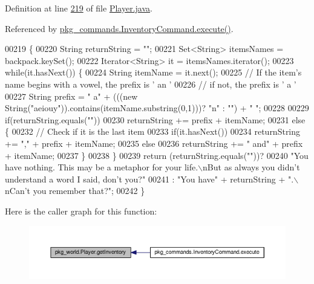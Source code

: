 Definition at line \hyperlink{Player_8java_source_l00219}{219} of file \hyperlink{Player_8java_source}{Player.\-java}.



Referenced by \hyperlink{InventoryCommand_8java_source_l00023}{pkg\-\_\-commands.\-Inventory\-Command.\-execute()}.


\begin{DoxyCode}
00219                                  \{
00220         String returnString = \textcolor{stringliteral}{""};
00221         Set<String> itemsNames = backpack.keySet();
00222         Iterator<String> it = itemsNames.iterator();
00223         \textcolor{keywordflow}{while}(it.hasNext()) \{
00224             String itemName = it.next();
00225             \textcolor{comment}{// If the item's name begins with a vowel, the prefix is ' an '}
00226             \textcolor{comment}{// if not, the prefix is ' a '}
00227             String prefix = \textcolor{stringliteral}{" a"} + (((\textcolor{keyword}{new} String(\textcolor{stringliteral}{"aeiouy"})).contains(itemName.substring(0,1)))? \textcolor{stringliteral}{"n"} : \textcolor{stringliteral}{""}) +
       \textcolor{stringliteral}{" "};
00228 
00229             \textcolor{keywordflow}{if}(returnString.equals(\textcolor{stringliteral}{""}))
00230                 returnString += prefix + itemName;
00231             \textcolor{keywordflow}{else} \{
00232                 \textcolor{comment}{// Check if it is the last item}
00233                 \textcolor{keywordflow}{if}(it.hasNext())
00234                     returnString += \textcolor{stringliteral}{","} + prefix + itemName;
00235                 \textcolor{keywordflow}{else}
00236                     returnString += \textcolor{stringliteral}{" and"} + prefix + itemName;
00237             \}
00238         \}
00239         \textcolor{keywordflow}{return} (returnString.equals(\textcolor{stringliteral}{""}))?
00240             \textcolor{stringliteral}{"You have nothing. This may be a metaphor for your life.\(\backslash\)nBut as always you didn't understand a
       word I said, don't you?"}
00241             : \textcolor{stringliteral}{"You have"} + returnString + \textcolor{stringliteral}{".\(\backslash\)nCan't you remember that?"};
00242     \}
\end{DoxyCode}


Here is the caller graph for this function\-:
\nopagebreak
\begin{figure}[H]
\begin{center}
\leavevmode
\includegraphics[width=350pt]{classpkg__world_1_1Player_a2a6e491f41e159bbac42022e55df2d52_icgraph}
\end{center}
\end{figure}


